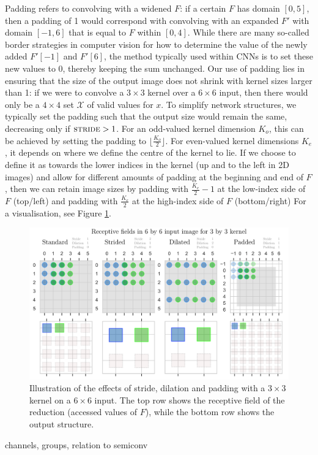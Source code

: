 \documentclass[a4paper, 12pt]{report}
\def\comment#1{\color{red}#1\color{black}}
\begin{document}
Padding refers to convolving with a widened $F$: if a certain $F$ has domain $[0, 5]$, then a padding of 1 would correspond with convolving with an expanded $F'$ with domain $[-1, 6]$ that is equal to $F$ within $[0, 4]$. While there are many so-called border strategies in computer vision for how to determine the value of the newly added $F'[-1]$ and $F'[6]$, the method typically used within CNNs is to set these new values to 0, thereby keeping the sum unchanged. 
Our use of padding lies in ensuring that the size of the output image does not shrink with kernel sizes larger than 1: if we were to convolve a $3\times3$ kernel over a $6\times6$ input, then there would only be a $4\times4$ set $\mathcal{X}$ of valid values for $x$. To simplify network structures, we typically set the padding such that the output size would remain the same, decreasing only if $\textsc{stride}>1$. For an odd-valued kernel dimension $K_o$, this can be achieved by setting the padding to $\lfloor\frac{K_o}{2}\rfloor$. For even-valued kernel dimensions $K_e$, it depends on where we define the centre of the kernel to lie. If we choose to define it as towards the lower indices in the kernel (up and to the left in 2D images) and allow for different amounts of padding at the beginning and end of $F$, then we can retain image sizes by padding with $\frac{K_e}{2}-1$ at the low-index side of $F$ (top/left) and padding with $\frac{K_e}{2}$ at the high-index side of $F$ (bottom/right) For a visualisation, see Figure \ref{fig:stride-dilation-padding}.

\begin{figure}[ht!]
	\center
  \includegraphics[width=\textwidth]{figures/stride-dilation-padding.png}
  \caption{Illustration of the effects of stride, dilation and padding with a $3\times3$ kernel on a $6\times6$ input. The top row shows the receptive field of the reduction (accessed values of $F$), while the bottom row shows the output structure.}
  \label{fig:stride-dilation-padding}
\end{figure}
\expandafter\show\the\font
\comment{channels, groups, relation to semiconv}
\end{document}
